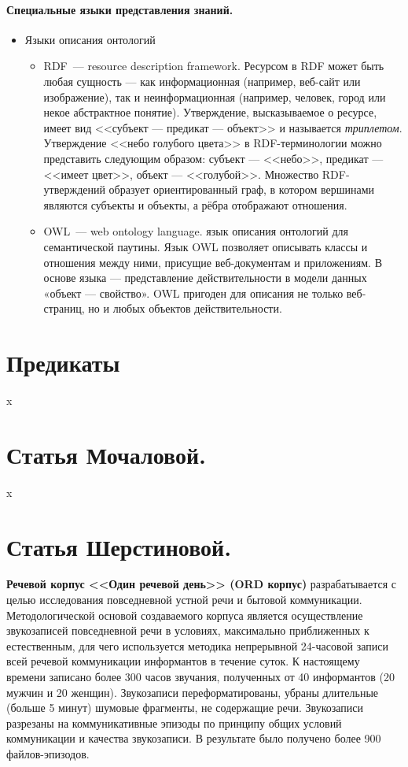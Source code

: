 \documentclass[12pt]{article}
\theoremstyle{definition}
\theoremstyle{remark}
\numberwithin{equation}{section}
\begin{document}
\paragraph{Специальные языки представления знаний.}
\begin{itemize}
\item Языки описания онтологий
\begin{itemize}
\item RDF~--- resource description framework. Ресурсом в RDF может быть любая сущность — как информационная (например, веб-сайт или изображение), так и неинформационная (например, человек, город или некое абстрактное понятие). Утверждение, высказываемое о ресурсе, имеет вид <<субъект — предикат — объект>> и называется \textsl{триплетом}. Утверждение <<небо голубого цвета>> в RDF-терминологии можно представить следующим образом: субъект — <<небо>>, предикат — <<имеет цвет>>, объект — <<голубой>>. Множество RDF-утверждений образует ориентированный граф, в котором вершинами являются субъекты и объекты, а рёбра отображают отношения.
\item OWL~--- web ontology language.  язык описания онтологий для семантической паутины. Язык OWL позволяет описывать классы и отношения между ними, присущие веб-документам и приложениям. В основе языка — представление действительности в модели данных «объект — свойство». OWL пригоден для описания не только веб-страниц, но и любых объектов действительности.
\end{itemize}
\end{itemize}

\section{Предикаты}
x
\section{Статья Мочаловой.}
x
\section{Статья Шерстиновой.}
\textbf{Речевой корпус <<Один речевой день>> (ORD корпус)} разрабатывается с целью исследования повседневной устной речи и бытовой коммуникации. Методологической основой создаваемого корпуса является осуществление звукозаписей повседневной речи в условиях, максимально приближенных к естественным, для чего используется методика непрерывной 24\nobreakdash-часовой записи всей речевой коммуникации информантов в течение суток. К настоящему времени записано более 300 часов звучания, полученных от 40 информантов (20 мужчин и 20 женщин). Звукозаписи переформатированы, убраны длительные (больше 5 минут) шумовые фрагменты, не содержащие речи. Звукозаписи разрезаны на коммуникативные эпизоды по принципу общих условий коммуникации и качества звукозаписи. В результате было получено более 900 файлов-эпизодов.
\end{document}
